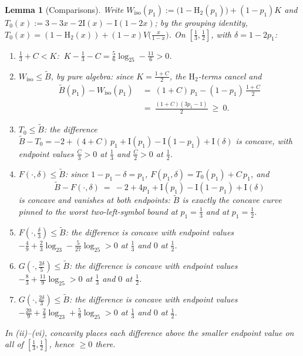 \documentclass[journal]{IEEEtran}
\newtheorem{lemma}{Lemma}
\theoremstyle{definition}
\newcommand{\Hh}{\mathrm H_2}
\newcommand{\lgg}{\log_2}
\newcommand{\CC}{C}
\begin{document}
\begin{lemma}[Comparisons]\label{lem:midcomp}
Write $W_{\mathrm{iso}}(p_1):=\bigl(1-\Hh(p_1)\bigr)+(1-p_1)K$ and
$T_0(x):=3-3x-2\mathrm I(x)-\mathrm I(1-2x)$; by the grouping identity,
$T_0(x)=(1-\Hh(x))+(1-x)V\bigl(\tfrac{x}{1-x}\bigr)$. On
$[\tfrac13,\tfrac12]$, with $\delta=1-2p_1$:
\begin{enumerate}
\item[\textup{(o)}] $\tfrac13+\CC<K$:
  $\ K-\tfrac13-\CC=\tfrac56\lgg5-\tfrac{11}6>0$.
\item[\textup{(i)}] $W_{\mathrm{iso}}\le\tilde B$, by pure algebra: since
  $K=\tfrac{1+\CC}2$, the $\Hh$-terms cancel and
  \[
  \begin{aligned}
    \tilde B(p_1)-W_{\mathrm{iso}}(p_1)\ &=\ (1+\CC)\,p_1-(1-p_1)\,\frac{1+\CC}{2}\\
    &=\ \frac{(1+\CC)(3p_1-1)}{2}\ \ge\ 0 .
  \end{aligned}
  \]
\item[\textup{(ii)}] $T_0\le\tilde B$: the difference
  $\tilde B-T_0=-2+(4+\CC)\,p_1+\mathrm I(p_1)-\mathrm I(1-p_1)+\mathrm I(\delta)$ is
  concave, with endpoint values $\tfrac{\CC}3>0$ at $\tfrac13$ and
  $\tfrac{\CC}2>0$ at $\tfrac12$.
\item[\textup{(iii)}] $F(\cdot,\delta)\le\tilde B$: since $1-p_1-\delta=p_1$,
  $F(p_1,\delta)=T_0(p_1)+\CC\,p_1$, and
  \[
    \tilde B-F(\cdot,\delta)\ =\ -2+4p_1+\mathrm I(p_1)-\mathrm I(1-p_1)+\mathrm I(\delta)
  \]
  is concave and vanishes at both endpoints: $\tilde B$ is exactly the
  concave curve pinned to the worst two-left-symbol bound at $p_1=\tfrac13$ and
  at $p_1=\tfrac12$.
\item[\textup{(iv)}] $F(\cdot,\tfrac\delta3)\le\tilde B$: the difference is
  concave with endpoint values
  $-\tfrac49+\tfrac23\lgg3-\tfrac5{27}\lgg5>0$ at $\tfrac13$
  and $0$ at $\tfrac12$.
\item[\textup{(v)}] $G(\cdot,\tfrac{2\delta}5)\le\tilde B$: the difference is
  concave with endpoint values $-\tfrac83+\tfrac{11}9\lgg5>0$
  at $\tfrac13$ and $0$ at $\tfrac12$.
\item[\textup{(vi)}] $G(\cdot,\tfrac{2\delta}3)\le\tilde B$: the difference is
  concave with endpoint values
  $-\tfrac{20}9+\tfrac23\lgg3+\tfrac59\lgg5>0$ at $\tfrac13$
  and $0$ at $\tfrac12$.
\end{enumerate}
In \textup{(ii)}--\textup{(vi)}, concavity places each difference above the
smaller endpoint value on all of $[\tfrac13,\tfrac12]$, hence $\ge0$ there.
\end{lemma}
\end{document}
